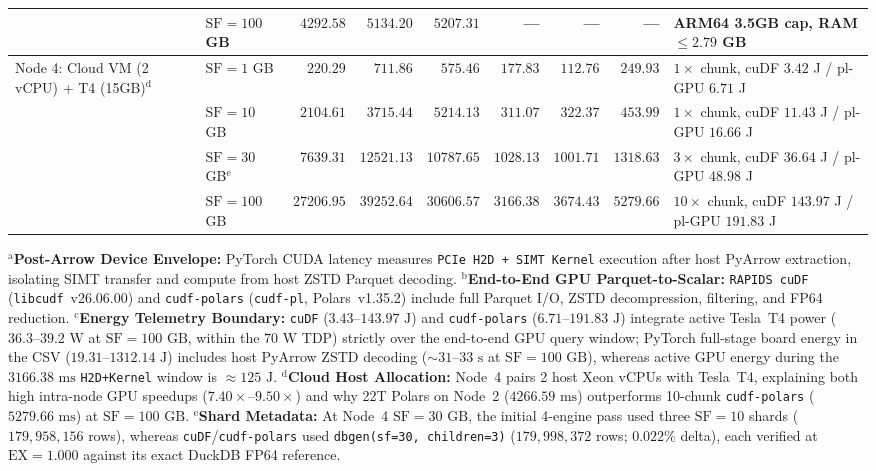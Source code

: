 \documentclass[10pt,a4paper]{article}
\begin{document}
\begin{table}[htbp]
{\begin{tabular}{@{}llrrrrrrl@{}}
 & $\text{SF}=100$ GB & $4292.58$ & $5134.20$ & $5207.31$ & --- & --- & --- & ARM64 3.5GB cap, RAM $\le 2.79$ GB \\
\midrule
Node 4: Cloud VM (2 vCPU) + T4 (15GB)$^{\mathrm{d}}$ & $\text{SF}=1$ GB & $220.29$ & $711.86$ & $575.46$ & $177.83$ & $112.76$ & $249.93$ & $1\times$ chunk, cuDF $3.42$ J / pl-GPU $6.71$ J \\
 & $\text{SF}=10$ GB & $2104.61$ & $3715.44$ & $5214.13$ & $311.07$ & $322.37$ & $453.99$ & $1\times$ chunk, cuDF $11.43$ J / pl-GPU $16.66$ J \\
 & $\text{SF}=30$ GB$^{\mathrm{e}}$ & $7639.31$ & $12521.13$ & $10787.65$ & $1028.13$ & $1001.71$ & $1318.63$ & $3\times$ chunk, cuDF $36.64$ J / pl-GPU $48.98$ J \\
 & $\text{SF}=100$ GB & $27206.95$ & $39252.64$ & $30606.57$ & $3166.38$ & $3674.43$ & $5279.66$ & $10\times$ chunk, cuDF $143.97$ J / pl-GPU $191.83$ J \\
\bottomrule
\end{tabular}%
}
\vspace{3pt}\par{\scriptsize\raggedright $^{\mathrm{a}}$\textbf{Post-Arrow Device Envelope:} PyTorch CUDA latency measures \texttt{PCIe H2D + SIMT Kernel} execution after host PyArrow extraction, isolating SIMT transfer and compute from host ZSTD Parquet decoding. $^{\mathrm{b}}$\textbf{End-to-End GPU Parquet-to-Scalar:} \texttt{RAPIDS cuDF} (\texttt{libcudf}~v26.06.00) and \texttt{cudf-polars} (\texttt{cudf-pl}, Polars~v1.35.2) include full Parquet I/O, ZSTD decompression, filtering, and FP64 reduction. $^{\mathrm{c}}$\textbf{Energy Telemetry Boundary:} \texttt{cuDF} ($3.43\text{--}143.97\text{ J}$) and \texttt{cudf-polars} ($6.71\text{--}191.83\text{ J}$) integrate active Tesla~T4 power ($36.3\text{--}39.2\text{ W}$ at $\text{SF}=100\text{ GB}$, within the $70\text{ W}$ TDP) strictly over the end-to-end GPU query window; PyTorch full-stage board energy in the CSV ($19.31\text{--}1312.14\text{ J}$) includes host PyArrow ZSTD decoding ($\sim 31\text{--}33\text{ s}$ at $\text{SF}=100\text{ GB}$), whereas active GPU energy during the $3166.38\text{ ms}$ \texttt{H2D+Kernel} window is $\approx 125\text{ J}$. $^{\mathrm{d}}$\textbf{Cloud Host Allocation:} Node~4 pairs 2 host Xeon vCPUs with Tesla~T4, explaining both high intra-node GPU speedups ($7.40\times\text{--}9.50\times$) and why 22T Polars on Node~2 ($4266.59\text{ ms}$) outperforms 10-chunk \texttt{cudf-polars} ($5279.66\text{ ms}$) at $\text{SF}=100\text{ GB}$. $^{\mathrm{e}}$\textbf{Shard Metadata:} At Node~4 $\text{SF}=30\text{ GB}$, the initial 4-engine pass used three $\text{SF}=10$ shards ($179{,}958{,}156$ rows), whereas \texttt{cuDF}/\texttt{cudf-polars} used \texttt{dbgen(sf=30, children=3)} ($179{,}998{,}372$ rows; $0.022\%$ delta), each verified at $\text{EX}=1.000$ against its exact DuckDB FP64 reference.\par}
\end{table}
\end{document}

